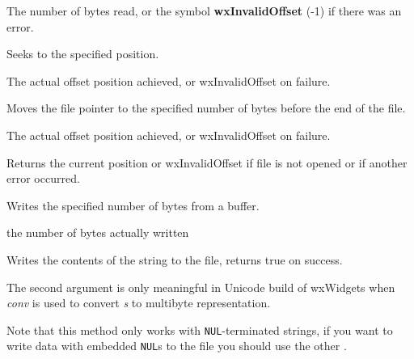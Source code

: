 
The number of bytes read, or the symbol {\bf wxInvalidOffset} (-1) if there was an error.

\label{wxfileseek}


Seeks to the specified position.





The actual offset position achieved, or wxInvalidOffset on failure.

\label{wxfileseekend}


Moves the file pointer to the specified number of bytes before the end of the file.




The actual offset position achieved, or wxInvalidOffset on failure.

\label{wxfiletell}


Returns the current position or wxInvalidOffset if file is not opened or if another
error occurred.

\label{wxfilewrite}


Writes the specified number of bytes from a buffer.





the number of bytes actually written

\label{wxfilewrites}


Writes the contents of the string to the file, returns true on success.

The second argument is only meaningful in Unicode build of wxWidgets when
{\it conv} is used to convert {\it s} to multibyte representation.

Note that this method only works with {\tt NUL}-terminated strings, if you want
to write data with embedded {\tt NUL}s to the file you should use the other 
.


